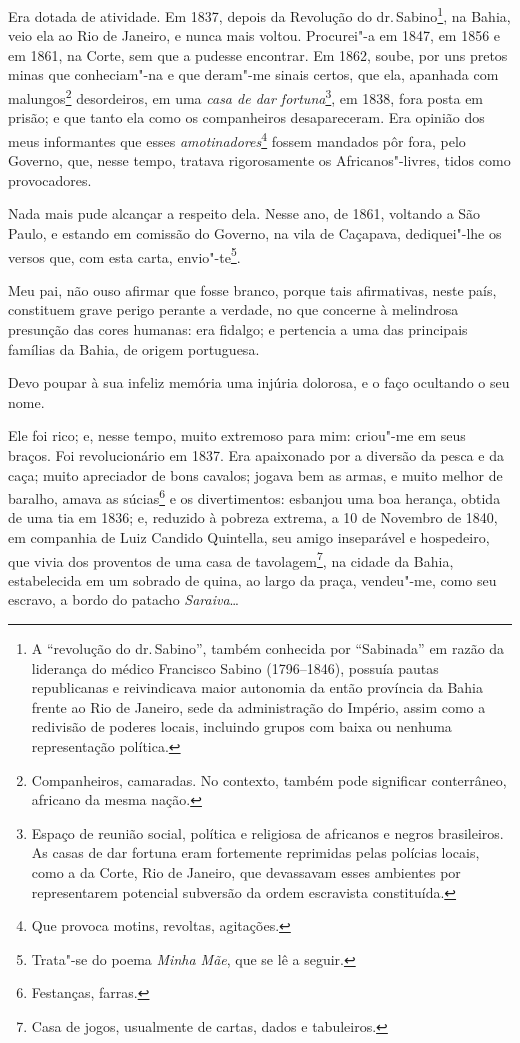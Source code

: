 Era dotada de atividade. Em 1837, depois da Revolução do dr.\,Sabino\footnote{A ``revolução do dr.\,Sabino'', também conhecida por
  ``Sabinada'' em razão da liderança do médico Francisco Sabino
  (1796--1846), possuía pautas republicanas e reivindicava maior
  autonomia da então província da Bahia frente ao Rio de Janeiro, sede
  da administração do Império, assim como a redivisão de poderes locais,
  incluindo grupos com baixa ou nenhuma representação política.}, na
Bahia, veio ela ao Rio de Janeiro, e nunca mais voltou. Procurei"-a em
1847, em 1856 e em 1861, na Corte, sem que a pudesse encontrar. Em 1862,
soube, por uns pretos minas que conheciam"-na e que deram"-me sinais
certos, que ela, apanhada com malungos\footnote{Companheiros,
  camaradas. No contexto, também pode significar conterrâneo, africano
  da mesma nação.} desordeiros, em uma \emph{casa de dar
fortuna}\footnote{Espaço de reunião social, política e religiosa de
  africanos e negros brasileiros. As casas de dar fortuna eram
  fortemente reprimidas pelas polícias locais, como a da Corte, Rio de
  Janeiro, que devassavam esses ambientes por representarem potencial
  subversão da ordem escravista constituída.}, em 1838, fora posta em
prisão; e que tanto ela como os companheiros desapareceram. Era opinião
dos meus informantes que esses \emph{amotinadores}\footnote{Que
  provoca motins, revoltas, agitações.} fossem mandados pôr fora, pelo
Governo, que, nesse tempo, tratava rigorosamente os Africanos"-livres,
tidos como provocadores.

Nada mais pude alcançar a respeito dela. Nesse ano, de 1861, voltando a
São Paulo, e estando em comissão do Governo, na vila de Caçapava,
dediquei"-lhe os versos que, com esta carta, envio"-te\footnote{Trata"-se
  do poema \emph{Minha Mãe}, que se lê a seguir.}.

Meu pai, não ouso afirmar que fosse branco, porque tais afirmativas,
neste país, constituem grave perigo perante a verdade, no que concerne à
melindrosa presunção das cores humanas: era fidalgo; e pertencia a uma
das principais famílias da Bahia, de origem portuguesa.

Devo poupar à sua infeliz memória uma injúria dolorosa, e o faço
ocultando o seu nome.

Ele foi rico; e, nesse tempo, muito extremoso para mim: criou"-me em seus
braços. Foi revolucionário em 1837. Era apaixonado por a diversão da
pesca e da caça; muito apreciador de bons cavalos; jogava bem as armas,
e muito melhor de baralho, amava as súcias\footnote{Festanças, farras.}
e os divertimentos: esbanjou uma boa herança, obtida de uma tia em 1836;
e, reduzido à pobreza extrema, a 10 de Novembro de 1840, em companhia de
Luiz Candido Quintella, seu amigo inseparável e hospedeiro, que vivia
dos proventos de uma casa de tavolagem\footnote{Casa de jogos,
  usualmente de cartas, dados e tabuleiros.}, na cidade da Bahia,
estabelecida em um sobrado de quina, ao largo da praça, vendeu"-me, como
seu escravo, a bordo do patacho \emph{Saraiva}\ldots{}

